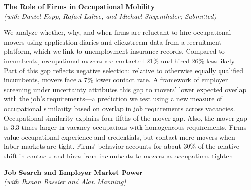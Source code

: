 \documentclass[11pt]{article}
\begin{document}
\vspace{8mm}
\hypertarget{abs:occmob}{}%
\begin{center}
{\Large\bfseries The Role of Firms in Occupational Mobility}\\[1mm]
{\itshape (with Daniel Kopp, Rafael Lalive, and Michael Siegenthaler; Submitted)}
\end{center}

We analyze whether, why, and when firms are reluctant to hire occupational movers using application diaries and clickstream data from a recruitment platform, which we link to unemployment insurance records. Compared to incumbents, occupational movers are contacted 21\% and hired 26\% less likely. Part of this gap reflects negative selection: relative to otherwise equally qualified incumbents, movers face a 7\% lower contact rate. A framework of employer screening under uncertainty attributes this gap to movers' lower expected overlap with the job's requirements---a prediction we test using a new measure of occupational similarity based on overlap in job requirements across vacancies. Occupational similarity explains four-fifths of the mover gap. Also, the mover gap is 3.3 times larger in vacancy occupations with homogeneous requirements. Firms value occupational experience and credentials, but contact more movers when labor markets are tight. Firms' behavior accounts for about 30\% of the relative shift in contacts and hires from incumbents to movers as occupations tighten.

\vspace{8mm}
\hypertarget{abs:power}{}%
\begin{center}
{\Large\bfseries Job Search and Employer Market Power}\\[1mm]
{\itshape (with Ihsaan Bassier and Alan Manning)}
\end{center}
\end{document}

